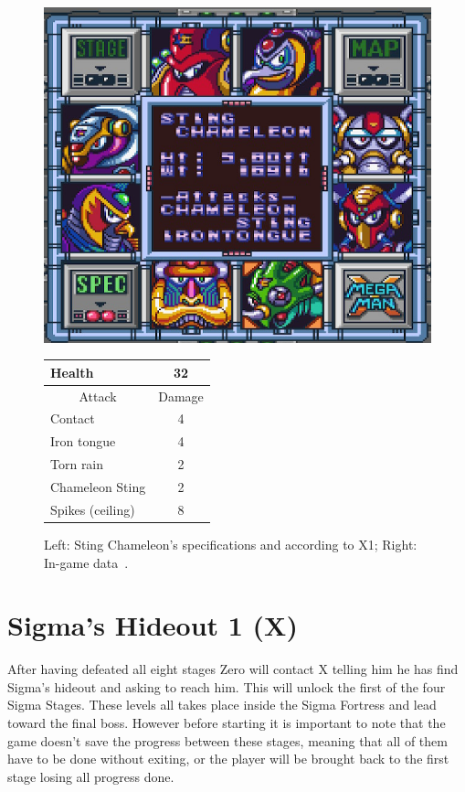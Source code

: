 \begin{figure}[htp]
	\begin{minipage}[c]{0.45\linewidth}
		\vspace{0pt}
		\centering
		\includegraphics[width=\linewidth]{figures/X1/Sting_chameleon/Sting_chameleon_specs.png}
	\end{minipage}
	\begin{minipage}[c]{0.45\linewidth}
		\centering
		\vspace{0pt}
		\begin{tabular}[h]{l c}
			\toprule
			Health  & 32\\
			\midrule
			\multicolumn{1}{c}{Attack} & \multicolumn{1}{c}{Damage}\\
			Contact & 4\\
			Iron tongue & 4\\
			Torn rain & 2\\
			Chameleon Sting & 2\\
			Spikes (ceiling) & 8\\
			\bottomrule
		\end{tabular}
	\end{minipage}
	\caption{Left: Sting Chameleon's specifications and according to X1; Right: In-game data~\cite{wiki:Sting_chameleon}. }
	\label{Chameleon_specs}
\end{figure}

\chapter{Sigma's Hideout 1 (X)}
After having defeated all eight stages Zero will contact X telling him he has find Sigma's hideout and asking to reach him. This will unlock the first of the four Sigma Stages. These levels all takes place inside the Sigma Fortress and lead toward the final boss. However before starting it is important to note that the game doesn't save the progress between these stages, meaning that all of them have to be done without exiting, or the player will be brought back to the first stage losing all progress done.

